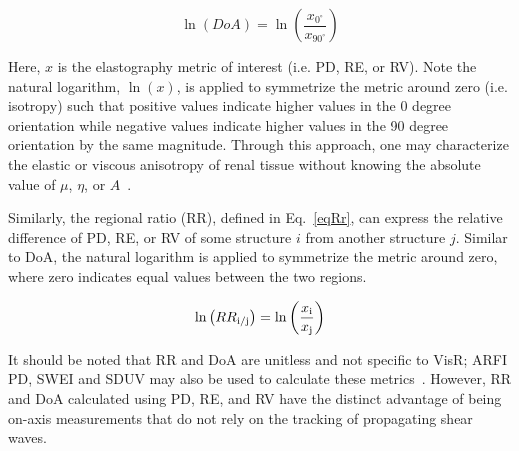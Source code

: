 \begin{equation}
    \ln \left( {DoA} \right) = \ln \left( \frac{x_{0^{\circ}}}{x_{90^{\circ}}} \right)
    \label{eqDoA}
\end{equation}

\noindent{}Here, $x$ is the elastography metric of interest (i.e. PD, RE, or RV). Note the natural logarithm, $\ln\left(x\right)$, is applied to symmetrize the metric around zero (i.e. isotropy) such that positive values indicate higher values in the 0 degree orientation while negative values indicate higher values in the 90 degree orientation by the same magnitude. Through this approach, one may characterize the elastic or viscous anisotropy of renal tissue without knowing the absolute value of $\mu$, $\eta$, or $A$~\cite{hossain_Viscoelastic_2020}.

\noindent Similarly, the regional ratio (RR), defined in Eq.~\eqref{eqRr}, can express the relative difference of PD, RE, or RV of some structure $i$ from another structure $j$. Similar to DoA, the natural logarithm is applied to symmetrize the metric around zero, where zero indicates equal values between the two regions.

\begin{equation}
    \ln \left( {RR}_{\textup{i/j}} \right) = \ln \left( \frac{x_{\textup{i}}}{x_{\textup{j}}} \right)
    \label{eqRr}
\end{equation}

It should be noted that RR and DoA are unitless and not specific to VisR; ARFI PD, SWEI and SDUV may also be used to calculate these metrics~\cite{hossain_Mechanical_2019}. However, RR and DoA calculated using PD, RE, and RV have the distinct advantage of being on-axis measurements that do not rely on the tracking of propagating shear waves.
